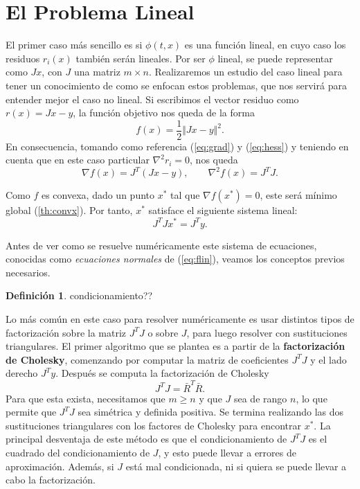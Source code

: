 \documentclass[11pt,a4paper]{book}
\theoremstyle{definition}
\newtheorem{definition}[theorem]{Definición}
\theoremstyle{remark}
\begin{document}
\section{El Problema Lineal}

El primer caso más sencillo es si $\phi (t, x)$ es una función lineal, en cuyo caso los residuos
$r_i(x)$ también serán lineales.
Por ser $\phi$ lineal, se puede representar como $Jx$, con $J$ una matriz
$m\times n$.
Realizaremos un estudio del caso lineal para tener un conocimiento de como se enfocan estos problemas, que nos servirá para entender mejor el caso no lineal.
Si escribimos el vector residuo como $r(x) = Jx-y$, la función objetivo nos queda de la forma
\begin{equation}
	f(x) = \frac{1}{2} \Vert Jx-y \Vert^2.
	\label{eq:flin}
\end{equation}
En consecuencia, tomando como referencia (\ref{eq:grad}) y (\ref{eq:hess}) y teniendo en cuenta que en este caso particular $\nabla^2r_i=0$, nos queda
\begin{equation}
	\nabla f(x) = J^T(Jx-y), \qquad \nabla^2 f(x) =  J^TJ.
\end{equation}

Como $f$ es convexa, dado un punto $x^*$ tal que $\nabla f(x^*) = 0$, este será mínimo global (\ref{th:convx}). Por tanto, $x^*$ satisface el siguiente sistema lineal:
\begin{equation}
	J^TJx^* = J^Ty.
\end{equation}

Antes de ver como se resuelve numéricamente este sistema de ecuaciones, conocidas como \textit{ecuaciones normales} de (\ref{eq:flin}), veamos los conceptos previos necesarios.

\begin{definition}
	condicionamiento??
\end{definition}

Lo más común en este caso para resolver numéricamente es usar distintos tipos de factorización sobre la matriz $J^TJ$ o sobre $J$, para luego resolver con sustituciones triangulares.
El primer algoritmo que se plantea es a partir de la \textbf{factorización de Cholesky}, comenzando por computar la matriz de coeficientes $J^TJ$ y el lado derecho $J^Ty$. Después se computa la factorización de Cholesky
\begin{equation}
	J^TJ = \bar R^T\bar R.
\end{equation}
Para que esta exista, necesitamos que $m \geq n$ y que $J$ sea de rango $n$,
lo que permite que $J^TJ$ sea simétrica y definida positiva.
Se termina realizando las dos sustituciones triangulares con los factores de Cholesky para encontrar $x^*$.
La principal desventaja de este método es que el condicionamiento de $J^TJ$ es el cuadrado del condicionamiento de $J$, y esto puede llevar a errores de aproximación.
Además, si $J$ está mal condicionada, ni si quiera se puede llevar a cabo la factorización.
\end{document}
